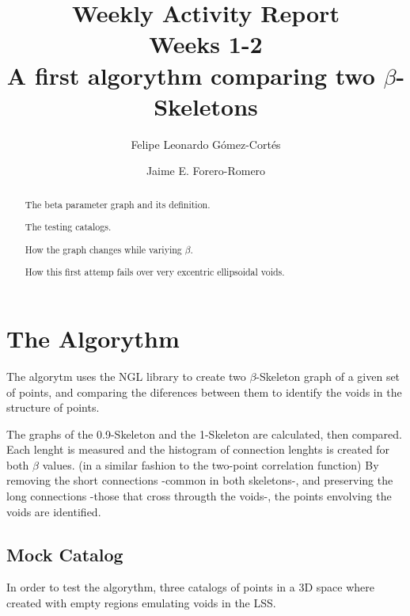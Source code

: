 \documentclass[preprint]{aastex62}
\begin{document}
\title{Weekly Activity Report\\Weeks 1-2\\A first algorythm comparing two $\beta$-Skeletons}


\author{Felipe Leonardo Gómez-Cortés}

\nocollaboration

\author{Jaime E. Forero-Romero}


\begin{abstract}
  The beta parameter graph and its definition.
  
  The testing catalogs.

  How the graph changes while variying $\beta$.

  How this first attemp fails over very excentric ellipsoidal voids.
  

\end{abstract}

\section{The Algorythm}

The algorytm uses the NGL library %
to create two $\beta$-Skeleton graph of a given set of points,
and comparing the diferences between them to identify the
voids in the structure of points.

The graphs of the 0.9-Skeleton and the 1-Skeleton are
calculated, then compared.
Each lenght is measured and the histogram of connection
lenghts is created for both $\beta$ values.
(in a similar fashion to the two-point correlation function)
By removing the short
connections -common in both skeletons-, and preserving the
long connections -those that cross througth the voids-,
the points envolving the voids are identified.


\subsection{Mock Catalog}
In order to test the algorythm, three catalogs of points in a 3D space
where created with empty regions emulating voids in the LSS.
\end{document}
